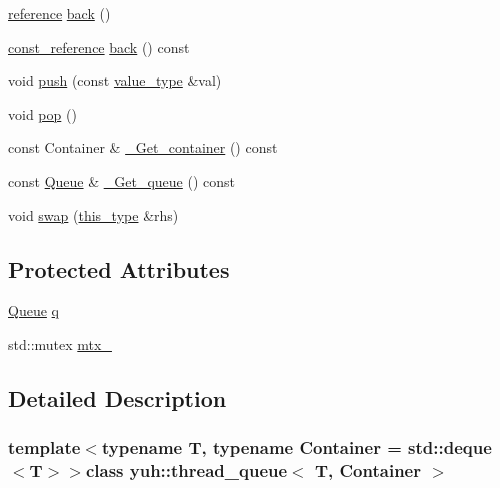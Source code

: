 \begin{DoxyCompactItemize}
$$\item 
\hyperlink{classyuh_1_1thread__queue_a2290230a4818fa015496b463bf8e4b0c}{reference} \hyperlink{classyuh_1_1thread__queue_af71e6c1eccbc12e9339c00a86a981a43}{back} ()
\item 
\hyperlink{classyuh_1_1thread__queue_aa25405d259f1bdab8c36b1d9f5a444cc}{const\-\_\-reference} \hyperlink{classyuh_1_1thread__queue_af181aa8839ff8d5867941fd0f0d214b6}{back} () const 
\item 
void \hyperlink{classyuh_1_1thread__queue_a7b58bc3c70024c68440d0d8465b9f80d}{push} (const \hyperlink{classyuh_1_1thread__queue_a6e0ae4bff8abfada948f8f378e5c701f}{value\-\_\-type} \&val)
\item 
void \hyperlink{classyuh_1_1thread__queue_a312e7f6c761a199c1369fbe651e084f0}{pop} ()
\item 
const \-Container \& \hyperlink{classyuh_1_1thread__queue_ade63bed704a7d2ae3b7087fc14864941}{\-\_\-\-Get\-\_\-container} () const 
\item 
const \hyperlink{classyuh_1_1thread__queue_a7298798dd8d5df210bee3a306107bd43}{\-Queue} \& \hyperlink{classyuh_1_1thread__queue_a1eb9c6b51435a911107097f15e19c233}{\-\_\-\-Get\-\_\-queue} () const 
\item 
void \hyperlink{classyuh_1_1thread__queue_accf0d7b5496638eebcd777de62feb9a4}{swap} (\hyperlink{classyuh_1_1thread__queue_a0b6cc122d5afe5dba8a2622add14ec45}{this\-\_\-type} \&rhs)
\end{DoxyCompactItemize}
\subsection*{\-Protected \-Attributes}
\begin{DoxyCompactItemize}
\item 
\hyperlink{classyuh_1_1thread__queue_a7298798dd8d5df210bee3a306107bd43}{\-Queue} \hyperlink{classyuh_1_1thread__queue_ab2e35c005c3ff9aeb95720a050b31c35}{q}
\item 
std\-::mutex \hyperlink{classyuh_1_1thread__queue_aeef4a7229a433a6ef6c6a8960b5fe413}{mtx\-\_\-}
\end{DoxyCompactItemize}


\subsection{\-Detailed \-Description}
\subsubsection*{template$<$typename \-T, typename \-Container = std\-::deque$<$\-T$>$$>$class yuh\-::thread\-\_\-queue$<$ T, Container $>$}



